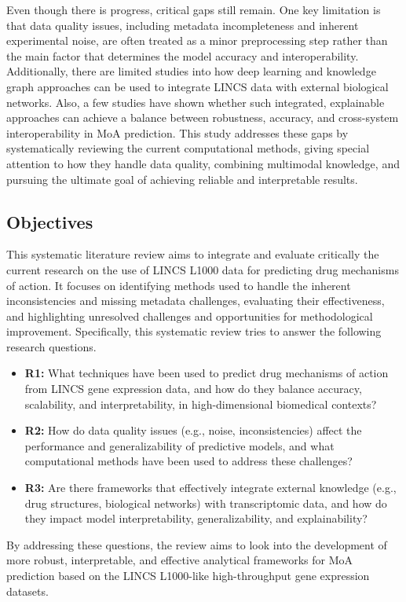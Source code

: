 \documentclass[twocolumn]{article}
\begin{document}
Even though there is progress, critical gaps still remain. One key limitation is that data quality issues, including metadata incompleteness and inherent experimental noise, are often treated as a minor preprocessing step rather than the main factor that determines the model accuracy and interoperability\cite{stathias2018sustainable}. Additionally, there are limited studies into how deep learning and knowledge graph approaches can be used to integrate LINCS data with external biological networks. Also, a few studies have shown whether such integrated, explainable approaches can achieve a balance between robustness, accuracy, and cross-system interoperability in MoA prediction\cite{ye2025knowledge,evangelista2023toxicology,wu2022deep}. This study addresses these gaps by systematically reviewing the current computational methods, giving special attention to how they handle data quality, combining multimodal knowledge, and pursuing the ultimate goal of achieving reliable and interpretable results.

\subsection{Objectives}
This systematic literature review aims to integrate and evaluate critically the current research on the use of LINCS L1000 data for predicting drug mechanisms of action. It focuses on identifying methods used to handle the inherent inconsistencies and missing metadata challenges, evaluating their effectiveness, and highlighting unresolved challenges and opportunities for methodological improvement. Specifically, this systematic review tries to answer the following research questions.
\begin{itemize}  
  \item \textbf{R1:} What techniques have been used to predict drug mechanisms of action from LINCS gene expression data, and how do they balance accuracy, scalability, and interpretability, in high-dimensional biomedical contexts?
  \item \textbf{R2:} How do data quality issues (e.g., noise, inconsistencies) affect the performance and generalizability of predictive models, and what computational methods have been used to address these challenges?
  \item \textbf{R3:} Are there frameworks that effectively integrate external knowledge (e.g., drug structures, biological networks) with transcriptomic data, and how do they impact model interpretability, generalizability, and explainability?
\end{itemize}
By addressing these questions, the review aims to look into the development of more robust, interpretable, and effective analytical frameworks for MoA prediction based on the LINCS L1000-like high-throughput gene expression datasets.
\end{document}
